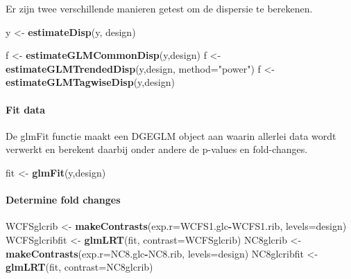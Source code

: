 \documentclass[
]{article}
\newenvironment{Shaded}{\begin{snugshade}}{\end{snugshade}}
\newcommand{\DataTypeTok}[1]{\textcolor[rgb]{0.13,0.29,0.53}{#1}}
\newcommand{\KeywordTok}[1]{\textcolor[rgb]{0.13,0.29,0.53}{\textbf{#1}}}
\newcommand{\NormalTok}[1]{#1}
\newcommand{\OperatorTok}[1]{\textcolor[rgb]{0.81,0.36,0.00}{\textbf{#1}}}
\newcommand{\StringTok}[1]{\textcolor[rgb]{0.31,0.60,0.02}{#1}}
\begin{document}
Er zijn twee verschillende manieren getest om de dispersie te berekenen.

\begin{Shaded}
\begin{Highlighting}[]
\NormalTok{y <-}\StringTok{ }\KeywordTok{estimateDisp}\NormalTok{(y, design)}

\NormalTok{f <-}\StringTok{ }\KeywordTok{estimateGLMCommonDisp}\NormalTok{(y,design)}
\NormalTok{f <-}\StringTok{ }\KeywordTok{estimateGLMTrendedDisp}\NormalTok{(y,design, }\DataTypeTok{method=}\StringTok{"power"}\NormalTok{)}
\NormalTok{f <-}\StringTok{ }\KeywordTok{estimateGLMTagwiseDisp}\NormalTok{(y,design)}
\end{Highlighting}
\end{Shaded}

\hypertarget{fit-data}{%
\paragraph{Fit data}\label{fit-data}}

De glmFit functie maakt een DGEGLM object aan waarin allerlei data wordt
verwerkt en berekent daarbij onder andere de p-values en fold-changes.

\begin{Shaded}
\begin{Highlighting}[]
\NormalTok{fit <-}\StringTok{ }\KeywordTok{glmFit}\NormalTok{(y,design)}
\end{Highlighting}
\end{Shaded}

\hypertarget{determine-fold-changes}{%
\paragraph{Determine fold changes}\label{determine-fold-changes}}

\begin{Shaded}
\begin{Highlighting}[]
\NormalTok{WCFSglcrib <-}\StringTok{ }\KeywordTok{makeContrasts}\NormalTok{(}\DataTypeTok{exp.r=}\NormalTok{WCFS1.glc}\OperatorTok{-}\NormalTok{WCFS1.rib, }\DataTypeTok{levels=}\NormalTok{design)}
\NormalTok{WCFSglcribfit <-}\StringTok{ }\KeywordTok{glmLRT}\NormalTok{(fit, }\DataTypeTok{contrast=}\NormalTok{WCFSglcrib)}
\NormalTok{NC8glcrib <-}\StringTok{ }\KeywordTok{makeContrasts}\NormalTok{(}\DataTypeTok{exp.r=}\NormalTok{NC8.glc}\OperatorTok{-}\NormalTok{NC8.rib, }\DataTypeTok{levels=}\NormalTok{design)}
\NormalTok{NC8glcribfit <-}\StringTok{ }\KeywordTok{glmLRT}\NormalTok{(fit, }\DataTypeTok{contrast=}\NormalTok{NC8glcrib)}
\end{Highlighting}
\end{Shaded}
\end{document}
